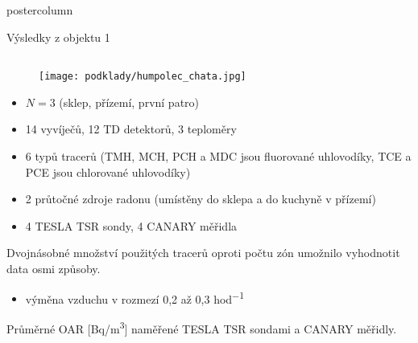\documentclass{beamer}
\begin{document}
\begin{frame}
\begin{columns}
\begin{column}{.57\textwidth}
\begin{beamercolorbox}[center]{postercolumn}
\begin{minipage}{.98\textwidth}
{\begin{myblock}{Výsledky z objektu 1}
    \begin{columns}
        \centering
        \begin{column}{.55\textwidth}
            \begin{figure}
                \centering
                \texttt{[image: podklady/humpolec\_chata.jpg]}
                \label{fig:skala75_dum}
            \end{figure}
            \begin{itemize}
                \item $N=3$ (sklep, přízemí, první patro)
                \item 14 vyvíječů, 12 TD detektorů, 3 teploměry
                \item 6 typů tracerů (TMH, MCH, PCH a MDC jsou fluorované uhlovodíky, TCE a PCE jsou chlorované uhlovodíky)
                \item 2 průtočné zdroje radonu (umístěny do sklepa a do kuchyně v přízemí)
                \item 4 TESLA TSR sondy, 4 CANARY měřidla
            \end{itemize}
            Dvojnásobné množství použitých tracerů oproti počtu zón umožnilo vyhodnotit data osmi způsoby.
            \begin{itemize}
                \item výměna vzduchu v rozmezí 0,2 až 0,3 \si{hod^{-1}}
            \end{itemize}
            \begin{table}
                \scriptsize
                \centering
                \caption{Průměrné OAR [\si{Bq/m^3}] naměřené TESLA TSR sondami a CANARY měřidly.}
                \label{tab:skala75_OAR}
                
            \end{table}
        \end{column}


\end{columns}
\end{myblock}}
\end{minipage}
\end{beamercolorbox}
\end{column}
\end{columns}
\end{frame}
\end{document}
